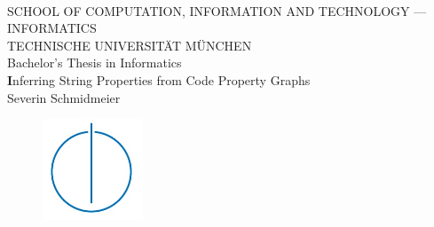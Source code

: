 \documentclass[footsepline,footinclude=false,oneside,fontsize=11pt,paper=a4,listof=totoc,bibliography=totoc]{scrbook} %
\newcommand{\thesistitle}{Inferring String Properties from Code Property Graphs}
\newcommand{\name}{Severin Schmidmeier}
\begin{document}
\nocite{*} %
\hoffset=5mm
\thispagestyle{empty}

\begin{center}
	\bigskip \bigskip \bigskip
	\oTUM{5.0cm} \\
	\vspace*{0.8cm}
	{\huge SCHOOL OF COMPUTATION, INFORMATION AND TECHNOLOGY --- INFORMATICS} \\
	\bigskip \bigskip
	{\Large TECHNISCHE UNIVERSIT\"AT M\"UNCHEN} \\
	\bigskip \bigskip \bigskip \bigskip \bigskip
	{\Large Bachelor's Thesis in Informatics} \\
	\bigskip \bigskip \bigskip \bigskip \bigskip
	{\LARGE \textbf \thesistitle} \\
	\bigskip \bigskip \bigskip \bigskip
	{\Large \name} \\    
	\bigskip\bigskip
	\begin{figure}[htbp]
	\centering \includegraphics[width=3cm]{logos/infologo.jpg}
	\end{figure}
	\bigskip 
\end{center}

\vfill

\newpage
\hoffset=5mm
\thispagestyle{empty}
\end{document}
